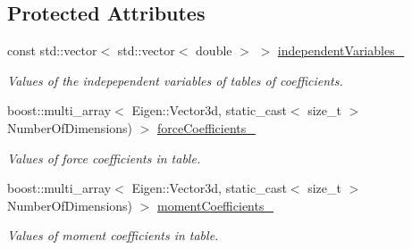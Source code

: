 \subsection*{Protected Attributes}
\begin{DoxyCompactItemize}
\item 
const std\+::vector$<$ std\+::vector$<$ double $>$ $>$ \hyperlink{classtudat_1_1simulation__setup_1_1TabulatedControlSurfaceIncrementAerodynamicCoefficientSettings_a78cbcce947a29df38ee245091e1cd4e9}{independent\+Variables\+\_\+}\hypertarget{classtudat_1_1simulation__setup_1_1TabulatedControlSurfaceIncrementAerodynamicCoefficientSettings_a78cbcce947a29df38ee245091e1cd4e9}{}\label{classtudat_1_1simulation__setup_1_1TabulatedControlSurfaceIncrementAerodynamicCoefficientSettings_a78cbcce947a29df38ee245091e1cd4e9}

\begin{DoxyCompactList}\small\item\em Values of the indepependent variables of tables of coefficients. \end{DoxyCompactList}\item 
boost\+::multi\+\_\+array$<$ Eigen\+::\+Vector3d, static\+\_\+cast$<$ size\+\_\+t $>$ Number\+Of\+Dimensions) $>$ \hyperlink{classtudat_1_1simulation__setup_1_1TabulatedControlSurfaceIncrementAerodynamicCoefficientSettings_a10b74249093736a0fe9ffe658bb65424}{force\+Coefficients\+\_\+}\hypertarget{classtudat_1_1simulation__setup_1_1TabulatedControlSurfaceIncrementAerodynamicCoefficientSettings_a10b74249093736a0fe9ffe658bb65424}{}\label{classtudat_1_1simulation__setup_1_1TabulatedControlSurfaceIncrementAerodynamicCoefficientSettings_a10b74249093736a0fe9ffe658bb65424}

\begin{DoxyCompactList}\small\item\em Values of force coefficients in table. \end{DoxyCompactList}\item 
boost\+::multi\+\_\+array$<$ Eigen\+::\+Vector3d, static\+\_\+cast$<$ size\+\_\+t $>$ Number\+Of\+Dimensions) $>$ \hyperlink{classtudat_1_1simulation__setup_1_1TabulatedControlSurfaceIncrementAerodynamicCoefficientSettings_a78b99580a308ff47b153c31e761cb049}{moment\+Coefficients\+\_\+}\hypertarget{classtudat_1_1simulation__setup_1_1TabulatedControlSurfaceIncrementAerodynamicCoefficientSettings_a78b99580a308ff47b153c31e761cb049}{}\label{classtudat_1_1simulation__setup_1_1TabulatedControlSurfaceIncrementAerodynamicCoefficientSettings_a78b99580a308ff47b153c31e761cb049}

\begin{DoxyCompactList}\small\item\em Values of moment coefficients in table. \end{DoxyCompactList}\end{DoxyCompactItemize}


